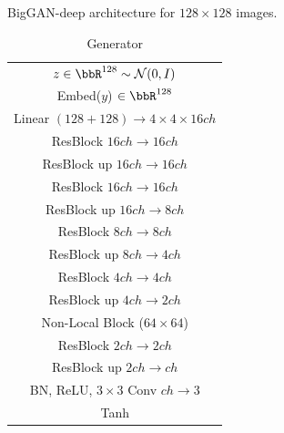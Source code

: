 \begin{table}[ht]
         \caption{\label{tab:deep_resnets_imagenet128} BigGAN-deep architecture for $128\times 128$ images.}
          \centering
          \small
          \begin{subtable}{.4\textwidth}
              \centering
              {\begin{tabular}{c}
                  \toprule
                  \midrule
                  $z\in \bbR^{128} \sim \mathcal{N}(0, I)$ \\
                  Embed($y$) $\in \bbR^{128}$ \\
                  \midrule
                  Linear $(128+128) \rightarrow 4 \times 4 \times 16 ch $ \\
                  \midrule
                  ResBlock $16ch \rightarrow 16ch$ \\
                  \midrule
                  ResBlock up $16ch \rightarrow 16ch$ \\
                  \midrule
                  ResBlock $16ch \rightarrow 16ch$ \\
                  \midrule
                  ResBlock up $16ch \rightarrow 8ch$ \\
                  \midrule
                  ResBlock $8ch \rightarrow 8ch$ \\
                  \midrule
                  ResBlock up $8ch \rightarrow 4ch$ \\
                  \midrule
                  ResBlock $4ch \rightarrow 4ch$ \\
                  \midrule
                  ResBlock up $4ch \rightarrow 2ch$ \\
                  \midrule
                  Non-Local Block ($64\times 64$)\\
                  \midrule
                  ResBlock $2ch \rightarrow 2ch$ \\
                  \midrule
                  ResBlock up $2ch \rightarrow ch$ \\
                  \midrule
                  BN, ReLU, $3\times 3$ Conv $ch\rightarrow 3$ \\
                  \midrule
                  Tanh\\
                  \midrule
                  \bottomrule
              \end{tabular}}
              \caption{\label{tab:deep_gen_resnet_imagenet_128} Generator}
          \end{subtable}
          \begin{subtable}{.4\textwidth}

\end{subtable}
\end{table}
